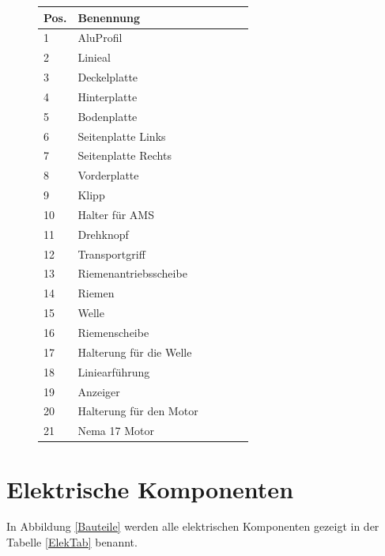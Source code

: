 \begin{figure}[H]
	\begin{center}
		\fontsize{8}{10}\selectfont
		\begin{tabularx}{\textwidth}{|p{0.4cm}|X|X|X|X|X|} 
			\hline 
			\textbf{Pos.} &  \textbf{Benennung} \\ \hline
			1 & AluProfil   \\ \hline
			2 & Linieal   \\ \hline
			3 & Deckelplatte   \\ \hline
			4 & Hinterplatte   \\ \hline
			5 & Bodenplatte   \\ \hline
			6 & Seitenplatte Links \\ \hline
			7 & Seitenplatte Rechts  \\ \hline
			8 & Vorderplatte  \\ \hline
			9 & Klipp  \\ \hline
			10 & Halter für AMS  \\ \hline
			11 & Drehknopf  \\ \hline
			12 & Transportgriff  \\ \hline
			13 & Riemenantriebsscheibe  \\ \hline
			14 & Riemen  \\ \hline
			15 & Welle  \\ \hline
			16 & Riemenscheibe  \\ \hline
			17 & Halterung für die Welle  \\ \hline
			18 & Liniearführung  \\ \hline
			19 & Anzeiger  \\ \hline
			20 & Halterung für den Motor  \\ \hline
			21 & Nema 17 Motor  \\ \hline		
				
		\end{tabularx}
			\label{BauTab}
	\end{center}
\end{figure}


\section{Elektrische Komponenten}
In Abbildung \ref{Bauteile} werden alle elektrischen Komponenten gezeigt in der Tabelle \ref{ElekTab} benannt.

